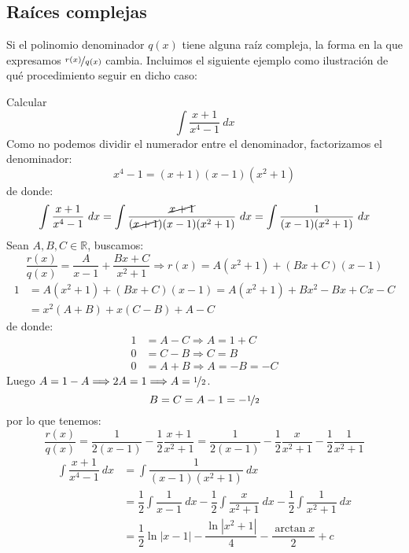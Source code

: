 \subsection{Raíces complejas}
Si el polinomio denominador $q(x)$ tiene alguna raíz compleja, la forma en la que expresamos $\nicefrac{r(x)}{q(x)}$ cambia. Incluimos el siguiente ejemplo como ilustración de qué procedimiento seguir en dicho caso:
\begin{ejemplo}
    Calcular
    \begin{equation*}
        \displaystyle\int \dfrac{x+1}{x^4-1}~dx 
    \end{equation*}
    Como no podemos dividir el numerador entre el denominador, factorizamos el denominador:
    \begin{equation*}
        x^4 -1 = (x+1)(x-1)(x^2+1)
    \end{equation*}
    de donde:
    \begin{equation*}
        \displaystyle\int \dfrac{x+1}{x^4-1}~dx = \displaystyle\int \dfrac{\cancel{x+1}}{(\cancel{x+1})(x-1)(x^2+1)}~dx = \displaystyle\int \dfrac{1}{(x-1)(x^2+1)}~dx 
    \end{equation*}
    Sean $A,B,C\in \mathbb{R}$, buscamos:
    \begin{equation*}
        \dfrac{r(x)}{q(x)} = \dfrac{A}{x-1}+ \dfrac{Bx+C}{x^2+1} \Longrightarrow r(x) = A(x^2+1) + (Bx+C)(x-1)
    \end{equation*}
    \begin{align*}
        1 &= A(x^2+1) + (Bx+C)(x-1) = A(x^2 + 1)+Bx^2-Bx + Cx - C \\
          &= x^2 (A + B) + x(C-B) + A - C
    \end{align*}
    de donde:
    \begin{align*}
        1 &= A - C \Longrightarrow A = 1 + C \\
        0 &= C - B \Longrightarrow C = B \\
        0 &= A+B \Longrightarrow A = -B = -C
    \end{align*}
    Luego $A = 1 - A \Longrightarrow 2A = 1 \Longrightarrow A = \nicefrac{1}{2}$.
    \begin{equation*}
        B = C = A - 1 = -\nicefrac{1}{2} \\
    \end{equation*}
    por lo que tenemos:
    \begin{equation*}
        \dfrac{r(x)}{q(x)} = \dfrac{1}{2(x-1)} -\dfrac{1}{2}\dfrac{x+1}{x^2+1} = \dfrac{1}{2(x-1)} - \dfrac{1}{2}\dfrac{x}{x^2+1}-\dfrac{1}{2}\dfrac{1}{x^2+1}
    \end{equation*}
    \begin{align*}
        \displaystyle\int \dfrac{x+1}{x^4-1}~dx &= \displaystyle\int \dfrac{1}{(x-1)(x^2+1)}~dx \\
        &= \dfrac{1}{2}\displaystyle\int \dfrac{1}{x-1}~dx -\dfrac{1}{2}\displaystyle\int \dfrac{x}{x^2+1}~dx -\dfrac{1}{2}\displaystyle\int \dfrac{1}{x^2+1}~dx \\
        &= \dfrac{1}{2}\ln|x-1| -\dfrac{\ln|x^2+1|}{4} -\dfrac{\arctan x}{2} + c
    \end{align*}
\end{ejemplo}


